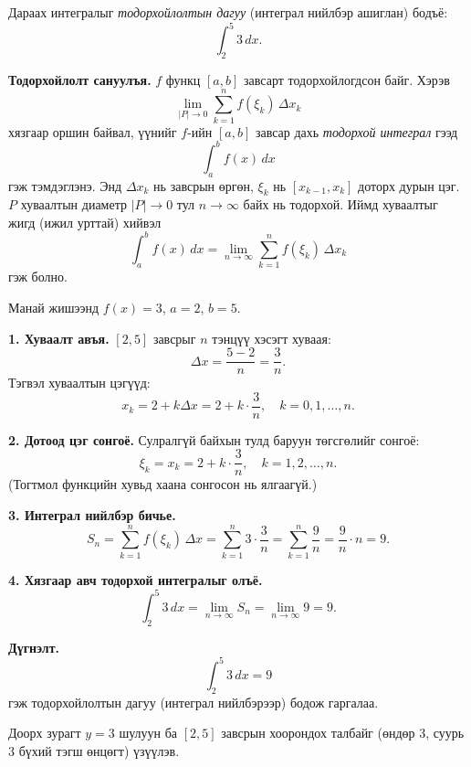 \begin{example}
Дараах интегралыг \emph{тодорхойлолтын дагуу} (интеграл нийлбэр ашиглан) бодъё:
\[
\int_{2}^{5} 3\,dx.
\]

\textbf{Тодорхойлолт сануулъя.} \;
$f$ функц $[a,b]$ завсарт тодорхойлогдсон байг. Хэрэв
\[
\lim_{|P|\to 0} \sum_{k=1}^{n} f(\xi_k)\,\Delta x_k
\]
хязгаар оршин байвал, үүнийг $f$-ийн $[a,b]$ завсар дахь \emph{тодорхой интеграл} гээд
\[
\int_a^b f(x)\,dx
\]
гэж тэмдэглэнэ. Энд $\Delta x_k$ нь завсрын өргөн, $\xi_k$ нь $[x_{k-1},x_k]$ доторх дурын цэг. $P$ хуваалтын диаметр $|P|\to 0$ тул $n\to\infty$ байх нь тодорхой. Иймд хуваалтыг жигд (ижил урттай) хийвэл \[
\int_a^b f(x)\,dx=\lim_{n\to\infty} \sum_{k=1}^{n} f(\xi_k)\,\Delta x_k
\]
гэж болно.
\medskip

Манай жишээнд $f(x)=3$, $a=2$, $b=5$.

\textbf{1. Хуваалт авъя.} \;
$[2,5]$ завсрыг $n$ тэнцүү хэсэгт хуваая:
\[
\Delta x = \frac{5-2}{n} = \frac{3}{n}.
\]
Тэгвэл хуваалтын цэгүүд:
\[
x_k = 2 + k\Delta x = 2 + k\cdot\frac{3}{n},\quad k=0,1,\dots,n.
\]

\textbf{2. Дотоод цэг сонгоё.} \;
Сулралгүй байхын тулд баруун төгсгөлийг сонгоё:
\[
\xi_k = x_k = 2 + k\cdot\frac{3}{n},\quad k=1,2,\dots,n.
\]
(Тогтмол функцийн хувьд хаана сонгосон нь ялгаагүй.)

\textbf{3. Интеграл нийлбэр бичье.}
\[
S_n
=
\sum_{k=1}^{n} f(\xi_k)\,\Delta x
=
\sum_{k=1}^{n} 3\cdot\frac{3}{n}
=
\sum_{k=1}^{n} \frac{9}{n}
=
\frac{9}{n}\cdot n
=
9.
\]

\textbf{4. Хязгаар авч тодорхой интегралыг олъё.}
\[
\int_{2}^{5} 3\,dx
=
\lim_{n\to\infty} S_n
=
\lim_{n\to\infty} 9
=
9.
\]

\textbf{Дүгнэлт.}
\[
\boxed{\int_{2}^{5} 3\,dx = 9}
\]
гэж тодорхойлолтын дагуу (интеграл нийлбэрээр) бодож гаргалаа.

\medskip

Доорх зурагт $y=3$ шулуун ба $[2,5]$ завсрын хоорондох талбайг (өндөр $3$, суурь $3$ бүхий тэгш өнцөгт) үзүүлэв.

\begin{center}
\end{center}

\end{example}

